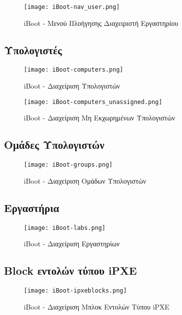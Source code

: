 \begin{figure}[ht]
	\centering
	\texttt{[image: iBoot-nav\_user.png]}
	\caption{iBoot - Μενού Πλοήγησης Διαχειριστή Εργαστηρίου}
	\label{fig:iBoot_nav_user}
\end{figure}
\FloatBarrier

\subsection{Υπολογιστές}
\FloatBarrier
\begin{figure}[ht]
	\centering
	\texttt{[image: iBoot-computers.png]}
	\caption{iBoot - Διαχείριση Υπολογιστών}
	\label{fig:iBoot_computers}
\end{figure}

\begin{figure}[ht]
	\centering
	\texttt{[image: iBoot-computers\_unassigned.png]}
	\caption{iBoot - Διαχείριση Μη Εκχωρημένων Υπολογιστών}
	\label{fig:iBoot_computers_unassigned}
\end{figure}
\FloatBarrier

\subsection{Ομάδες Υπολογιστών}
\FloatBarrier
\begin{figure}[ht]
	\centering
	\texttt{[image: iBoot-groups.png]}
	\caption{iBoot - Διαχείριση Ομάδων Υπολογιστών}
	\label{fig:iBoot_groups}
\end{figure}
\FloatBarrier

\subsection{Εργαστήρια}
\FloatBarrier
\begin{figure}[ht]
	\centering
	\texttt{[image: iBoot-labs.png]}
	\caption{iBoot - Διαχείριση Εργαστηρίων}
	\label{fig:iBoot_labs}
\end{figure}
\FloatBarrier

\subsection{Block εντολών τύπου iPXE}
\FloatBarrier
\begin{figure}[ht]
	\centering
	\texttt{[image: iBoot-ipxeblocks.png]}
	\caption{iBoot - Διαχείριση Μπλοκ Εντολών Τύπου iPXE}
	\label{fig:iBoot_ipxeblocks}
\end{figure}
\FloatBarrier

